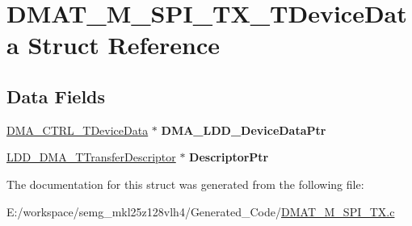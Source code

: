 \hypertarget{struct_d_m_a_t___m___s_p_i___t_x___t_device_data}{\section{D\-M\-A\-T\-\_\-\-M\-\_\-\-S\-P\-I\-\_\-\-T\-X\-\_\-\-T\-Device\-Data Struct Reference}
\label{struct_d_m_a_t___m___s_p_i___t_x___t_device_data}
}
\subsection*{Data Fields}
\begin{DoxyCompactItemize}
\item 
\hypertarget{struct_d_m_a_t___m___s_p_i___t_x___t_device_data_a964a4553a2d7024cbbd156050887a009}{\hyperlink{struct_d_m_a___c_t_r_l___t_device_data}{D\-M\-A\-\_\-\-C\-T\-R\-L\-\_\-\-T\-Device\-Data} $\ast$ {\bfseries D\-M\-A\-\_\-\-L\-D\-D\-\_\-\-Device\-Data\-Ptr}}\label{struct_d_m_a_t___m___s_p_i___t_x___t_device_data_a964a4553a2d7024cbbd156050887a009}

\item 
\hypertarget{struct_d_m_a_t___m___s_p_i___t_x___t_device_data_a980881f29d5393a44577660d4252e6d7}{\hyperlink{struct_l_d_d___d_m_a___t_transfer_descriptor}{L\-D\-D\-\_\-\-D\-M\-A\-\_\-\-T\-Transfer\-Descriptor} $\ast$ {\bfseries Descriptor\-Ptr}}\label{struct_d_m_a_t___m___s_p_i___t_x___t_device_data_a980881f29d5393a44577660d4252e6d7}

\end{DoxyCompactItemize}


The documentation for this struct was generated from the following file\-:\begin{DoxyCompactItemize}
\item 
E\-:/workspace/semg\-\_\-mkl25z128vlh4/\-Generated\-\_\-\-Code/\hyperlink{_d_m_a_t___m___s_p_i___t_x_8c}{D\-M\-A\-T\-\_\-\-M\-\_\-\-S\-P\-I\-\_\-\-T\-X.\-c}\end{DoxyCompactItemize}
